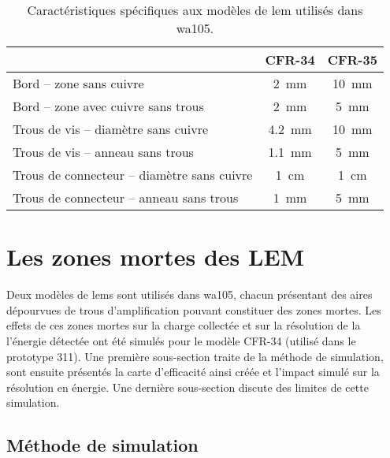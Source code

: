             \begin{table}\label{tab::lem_diff}
                \centering
                \begin{tabular}{|l|c|c|}
                    \hline
                     & CFR-34 & CFR-35\\
                    \hline
                    Bord -- zone sans cuivre & \SI{2}{\milli\meter} & \SI{10}{\milli\meter}\\
                    Bord -- zone avec cuivre sans trous & \SI{2}{\milli\meter} & \SI{5}{\milli\meter}\\
                    Trous de vis -- diamètre sans cuivre & \SI{4.2}{\milli\meter} & \SI{10}{\milli\meter} \\
                    Trous de vis -- anneau sans trous &  \SI{1.1}{\milli\meter} & \SI{5}{\milli\meter} \\
                    Trous de connecteur -- diamètre sans cuivre & \SI{1}{\centi\meter} & \SI{1}{\centi\meter} \\
                    Trous de connecteur -- anneau sans trous & \SI{1}{\milli\meter} & \SI{5}{\milli\meter} \\
                    \hline
                \end{tabular}
                \caption{Caractéristiques spécifiques aux modèles de \gls{lem} utilisés dans \gls{wa105}.}
            \end{table}
            
        
    \section{Les zones mortes des LEM}\label{sec::zones_mortes}
    
        Deux modèles de \glspl{lem} sont utilisés dans \gls{wa105}, chacun présentant des aires dépourvues de trous d'amplification pouvant constituer des zones mortes. Les effets de ces zones mortes sur la charge collectée et sur la résolution de la l'énergie détectée ont été simulés pour le modèle CFR-34 (utilisé dans le prototype 311). Une première sous-section traite de la méthode de simulation, sont ensuite présentés la carte d'efficacité ainsi créée et l'impact simulé sur la résolution en énergie. Une dernière sous-section discute des limites de cette simulation.
        
        \subsection{Méthode de simulation}
        
